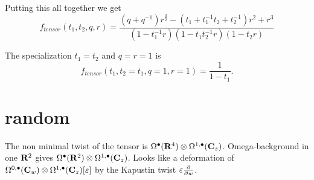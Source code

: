 \documentclass[11pt]{amsart}
\begin{document}
Putting this all together we get 
\[
f_{tensor} (t_1,t_2,q,r) = \frac{(q + q^{-1})r^{\frac32} - (t_1 + t_1^{-1} t_2 + t_2^{-1} )r^2 + r^3}{(1-t_1^{-1}r) (1-t_1 t_2^{-1} r) (1-t_2 r)} 
\]

The specialization $t_1=t_2$ and $q=r=1$ is
\[
f_{tensor}(t_1,t_2=t_1, q=1,r=1) = \frac1{1-t_1} .
\]

\section{random}

The non minimal twist of the tensor is $\Omega^\bullet(\mathbf{R}^4) \otimes \Omega^{1,\bullet}(\mathbf{C}_z)$.
Omega-background in one $\mathbf{R}^2$ gives $\Omega^\bullet(\mathbf{R}^2) \otimes \Omega^{1,\bullet}(\mathbf{C}_z)$.
Looks like a deformation of $\Omega^{0,\bullet}(\mathbf{C}_w) \otimes \Omega^{1,\bullet}(\mathbf{C}_z) [\varepsilon]$ by the Kapustin twist $\varepsilon \frac{\partial}{\partial w}$. 
\end{document}
